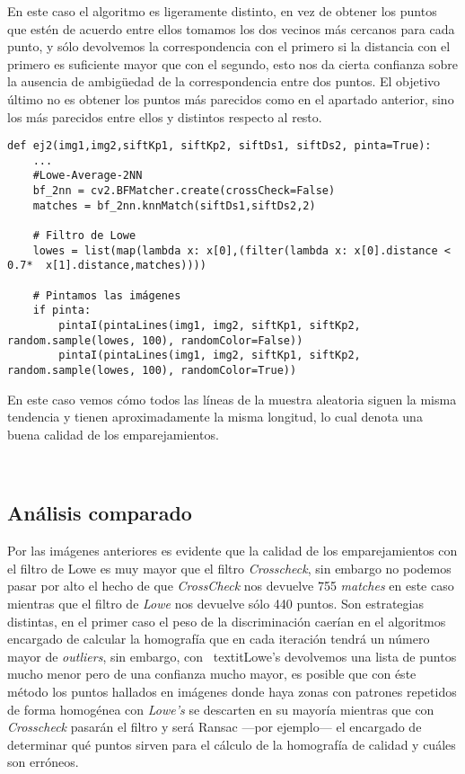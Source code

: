 \documentclass{article}
\newcommand{\img}[2]{
\noindent\makebox[\textwidth][c]{\texttt{[image: \#1]}}%
}
\begin{document}
En este caso el algoritmo es ligeramente distinto, en vez de obtener los puntos que estén de acuerdo entre ellos tomamos los dos vecinos más cercanos para cada punto, y sólo devolvemos la correspondencia con el primero si la distancia con el primero es suficiente mayor que con el segundo, esto nos da cierta confianza sobre la ausencia de ambigüedad de la correspondencia entre dos puntos. El objetivo último no es obtener los puntos más parecidos como en el apartado anterior, sino los más parecidos entre ellos y distintos respecto al resto.

\begin{lstlisting}
def ej2(img1,img2,siftKp1, siftKp2, siftDs1, siftDs2, pinta=True):
    ...
    #Lowe-Average-2NN
    bf_2nn = cv2.BFMatcher.create(crossCheck=False)
    matches = bf_2nn.knnMatch(siftDs1,siftDs2,2)
	
    # Filtro de Lowe
    lowes = list(map(lambda x: x[0],(filter(lambda x: x[0].distance < 0.7*  x[1].distance,matches))))
    
    # Pintamos las imágenes
    if pinta:
        pintaI(pintaLines(img1, img2, siftKp1, siftKp2, random.sample(lowes, 100), randomColor=False))
        pintaI(pintaLines(img1, img2, siftKp1, siftKp2, random.sample(lowes, 100), randomColor=True))
\end{lstlisting}

En este caso vemos cómo todos las líneas de la muestra aleatoria siguen la misma tendencia y tienen aproximadamente la misma longitud, lo cual denota una buena calidad de los emparejamientos.

\img{img/lowe_tend}{0.8}
\\

\img{img/lowe_rand}{0.8}

\subsection{Análisis comparado}

Por las imágenes anteriores es evidente que la calidad de los emparejamientos con el filtro de Lowe es muy mayor que el filtro \textit{Crosscheck}, sin embargo no podemos pasar por alto el hecho de que \textit{CrossCheck} nos devuelve 755 \textit{matches} en este caso mientras que el filtro de \textit{Lowe} nos devuelve sólo 440 puntos. Son estrategias distintas, en el primer caso el peso de la discriminación caerían en el algoritmos encargado de calcular la homografía que en cada iteración tendrá un número mayor de \textit{outliers}, sin embargo, con \
textit{Lowe's} devolvemos una lista de puntos mucho menor pero de una confianza mucho mayor, es posible que con éste método los puntos hallados en imágenes donde haya zonas con patrones repetidos de forma homogénea con \textit{Lowe's} se descarten en su mayoría mientras que con \textit{Crosscheck} pasarán el filtro y será Ransac ---por ejemplo--- el encargado de determinar qué puntos sirven para el cálculo de la homografía de calidad y cuáles son erróneos.
\end{document}
